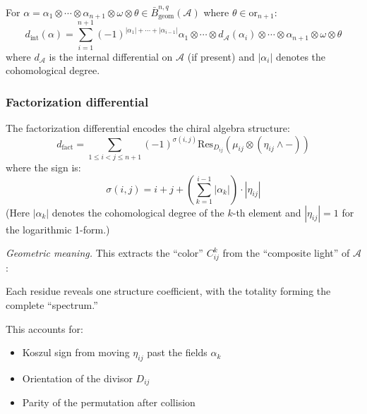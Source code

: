 \begin{definition}
For $\alpha = \alpha_1 \otimes \cdots \otimes \alpha_{n+1} \otimes \omega \otimes \theta \in 
\bar{B}^{n,q}_{\text{geom}}(\mathcal{A})$ where $\theta \in \text{or}_{n+1}$:
\[
d_{\text{int}}(\alpha) = \sum_{i=1}^{n+1} (-1)^{|\alpha_1| + \cdots + |\alpha_{i-1}|} 
\alpha_1 \otimes \cdots \otimes d_{\mathcal{A}}(\alpha_i) \otimes \cdots \otimes \alpha_{n+1} \otimes \omega \otimes \theta
\]
where $d_{\mathcal{A}}$ is the internal differential on $\mathcal{A}$ (if present) and $|\alpha_i|$ denotes 
the cohomological degree.
\end{definition}
 
\subsubsection{Factorization differential}
 
\begin{definition}\label{def:diff-fact}
   The factorization differential encodes the chiral algebra structure:
   \[
   d_{\text{fact}} = \sum_{1 \leq i < j \leq n+1} (-1)^{\sigma(i,j)} \text{Res}_{D_{ij}} \left(\mu_{ij} \otimes (\eta_{ij} \wedge -)\right)
   \]
   where the sign is:
   \[\sigma(i,j) = i + j + \left(\sum_{k=1}^{i-1} |\alpha_k|\right) \cdot |\eta_{ij}|\]
   (Here $|\alpha_k|$ denotes the cohomological degree of the $k$-th element and $|\eta_{ij}| = 1$ for the logarithmic 1-form.)
   
   \emph{Geometric meaning.} This extracts the ``color'' $C_{ij}^k$ from the ``composite light'' of $\mathcal{A}$:
   \begin{center}
   \end{center}
   
   Each residue reveals one structure coefficient, with the totality forming the complete ``spectrum.''
   
   This accounts for:
   \begin{itemize}
   \item Koszul sign from moving $\eta_{ij}$ past the fields $\alpha_k$
   \item Orientation of the divisor $D_{ij}$  
   \item Parity of the permutation after collision
   \end{itemize}
   \end{definition}
   
